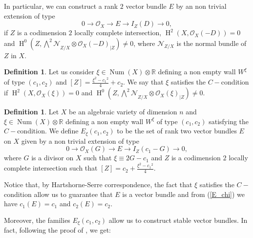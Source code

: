\documentclass[11pt,twoside]{amsart}
\theoremstyle{definition}
\newtheorem{definition}[theorem]{Definition}
\newcommand{\Num}{\operatorname{Num}}
\newcommand{\Ho}{\operatorname{H}}
\begin{document}
In particular, we can construct a rank $2$ vector bundle $E$ by an non trivial extension of type $$0\rightarrow \mathcal{O}_X\rightarrow E\rightarrow I_Z(D)\rightarrow0,$$ if $Z$ is a codimension $2$ locally complete intersection,   $\Ho^2(X,\mathcal{O}_X(-D))=0$ and $\Ho^0(Z,{\bigwedge^2\mathcal{N}}_{Z/ X}\otimes {\mathcal{O}_X(-D)}_{|Z})\neq0$, where $\mathcal{N}_{Z/ X}$ is the normal bundle of $Z$ in $X$.

\begin{definition}
    Let us consider $\xi\in \Num(X)\otimes\mathbb{R}$ defining a non empty wall $W^{\xi}$ of type $(c_1,c_2)$ and $[Z]=\frac{\xi^2-{c_1}^2}{4}+c_2$. We say that $\xi$ satisfies the $C-$condition if 
$\Ho^2(X,\mathcal{O}_X(\xi))=0$ and $\Ho^0(Z,{\bigwedge^2\mathcal{N}}_{Z/ X}\otimes\mathcal{O}_X(\xi)_{|Z})\neq0$.%

\end{definition}




\begin{definition}
\label{def_Exi}
    Let $X$ be an algebraic variety of dimension $n$ and $\xi\in\Num(X)\otimes\mathbb{R}$ defining a non empty wall $W^{\xi}$ of type $(c_1,c_2)$  satisfying the $C-$condition.
We define $E_{\xi}(c_1,c_2)$ to be the set of rank two vector bundles $E$ on $X$ given by a non trivial extension of type 
\begin{equation}
\label{E_chi}
    0\rightarrow \mathcal{O}_X(G)\rightarrow E\rightarrow I_Z(c_1-G)\rightarrow0,
\end{equation}
 where $G$ is a divisor on $X$ such that $\xi\equiv 2G-c_1$ and $Z$ is a codimension $2$ locally complete intersection  such that $[Z]=c_2+\frac{\xi^2-{c_1}^2}{4}$.
\end{definition}

Notice that, by  Hartshorne-Serre correspondence, the fact that $\xi$ satisfies the $C-$condition allow us to guarantee that $E$ is a vector bundle and from (\ref{E_chi}) we have  $c_1(E)=c_1$ and $c_2(E)=c_2$.



Moreover, the families $E_{\xi}(c_1,c_2)$ allow us to construct stable vector bundles. In fact, following the proof of \cite[Theorem 1.2.3]{Qin1}, we get:
\end{document}
